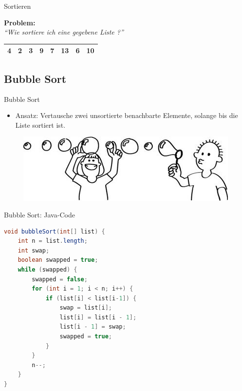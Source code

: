 \documentclass[18pt]{beamer}
\newcommand{\quotes}[1]{``#1''}
\begin{document}
\begin{frame}{Sortieren}
    \begin{block}{}
        \textbf{Problem:}\\
        \textit{\quotes{Wie sortiere ich eine gegebene Liste ?}}
    \end{block}
    \vspace{.2in}
    \begin{center}
        \begin{tabular}{|c|c|c|c|c|c|c|c|}
            \hline
            4 & 2 & 3 & 9 & 7 & 13 & 6 & 10 \\
            \hline
        \end{tabular}
    \end{center}
\end{frame}

\subsection{Bubble Sort}

\begin{frame}{Bubble Sort}
    \begin{itemize}
        \item Ansatz: Vertausche zwei unsortierte benachbarte Elemente, solange bis die Liste sortiert ist.
    \end{itemize}
    \vspace{.2in}
    \begin{figure}
        \includegraphics[scale=.5]{img/BubbleSort.jpg}
    \end{figure}
\end{frame}

\begin{frame}[fragile]{Bubble Sort: Java-Code}
    \begin{exampleblock}{}
        \begin{lstlisting}[language=Java,basicstyle=\scriptsize]
void bubbleSort(int[] list) {
    int n = list.length;
    int swap;
    boolean swapped = true;
    while (swapped) {
        swapped = false;
        for (int i = 1; i < n; i++) {
            if (list[i] < list[i-1]) {
                swap = list[i];
                list[i] = list[i - 1];
                list[i - 1] = swap;
                swapped = true;
            }
        }
        n--;
    }
}
        \end{lstlisting}
    \end{exampleblock}
\end{frame}
\end{document}
